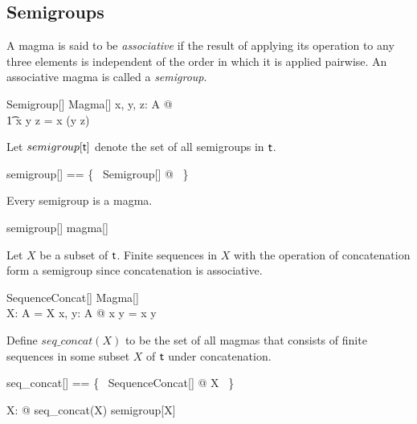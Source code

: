 \documentclass{amsart}
\begin{document}
\subsection{Semigroups}

A magma is said to be \textit{associative} if the result of applying its operation to any three elements
is independent of the order in which it is applied pairwise.
An associative magma is called a \textit{semigroup}.

\begin{schema}{Semigroup}[\genT]
	Magma[\genT]
\where
	\forall x, y, z: A @ \\
	\t1	x \opG y \opG z = x \opG (y \opG z)
\end{schema}

Let $semigroup[\mathsf{t}]$ denote the set of all semigroups in $\mathsf{t}$.

\begin{zed}
	semigroup[\genT] == \{~ Semigroup[\genT] @ \strucA  ~\}
\end{zed}

\begin{remark} Every semigroup is a magma.

\begin{zed}
	semigroup[\setT] \subseteq magma[\setT]
\end{zed}

\end{remark}

\begin{example}
Let $X$ be a subset of $\mathsf{t}$.
Finite sequences in $X$ with the operation of concatenation form a semigroup
since concatenation is associative.

\begin{schema}{SequenceConcat}[\genT]
	Magma[\seq \genT] \\
	X: \power \genT
\where
	A = \seq X
\also
	\forall x, y: A @ x \opG y = x \cat y
\end{schema}

Define $seq\_concat(X)$ to be the set of all magmas that consists of finite sequences in some subset
$X$ of $\mathsf{t}$ under concatenation.

\begin{zed}
	seq\_concat[\genT] == \{~ SequenceConcat[\genT] @ X \mapsto \strucA ~\}
\end{zed}

\begin{zed}
	\forall X: \power \setT @ seq\_concat(X) \in semigroup[\seq X]
\end{zed}

\end{example}
\end{document}
